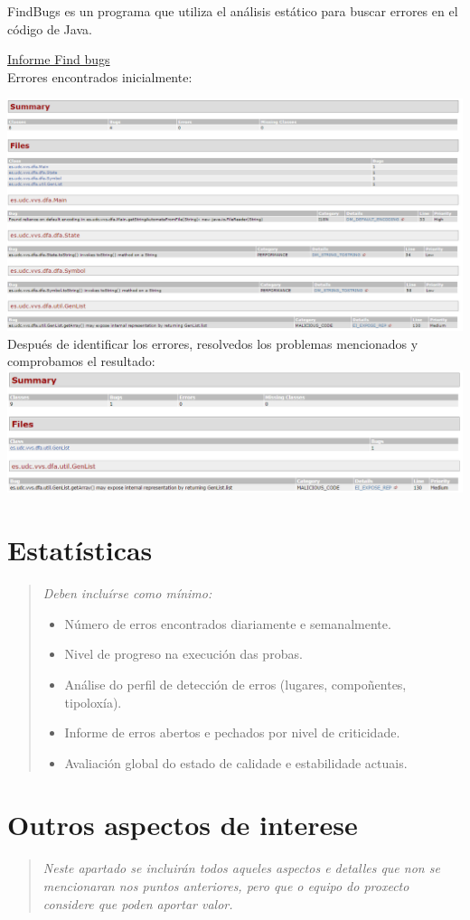 \documentclass[DIV=calc,paper=a4,fontsize=11pt,onecolumn]{scrartcl} %
\newcommand{\hint}[1]{\begin{quote}\itshape #1 \end{quote}}
\begin{document}
	FindBugs es un programa que utiliza el análisis estático para buscar errores en el código de Java.
	
	\href{Informes/SiteTestInicial/findbugs.html}{Informe Find bugs} \\
	
	Errores encontrados inicialmente:
	
	\includegraphics[width=15cm]{Imagenes/findBugs1.png} \\
	
	Después de identificar los errores, resolvedos los problemas mencionados y comprobamos el resultado:\\
	
	\includegraphics[width=15cm]{Imagenes/findBugs2.png} \\

\section{Estatísticas}

\hint{Deben incluírse como mínimo:
  \begin{itemize}
    \item Número de erros encontrados diariamente e semanalmente.
    \item Nivel de progreso na execución das probas.
    \item Análise do perfil de detección de erros (lugares, compoñentes, tipoloxía).
    \item Informe de erros abertos e pechados por nivel de criticidade.
    \item Avaliación global do estado de calidade e estabilidade actuais.
  \end{itemize}}

\section{Outros aspectos de interese}

\hint{Neste apartado se incluirán todos aqueles aspectos e detalles que non se
  mencionaran nos puntos anteriores, pero que o equipo do proxecto considere que
  poden aportar valor.}
\end{document}

